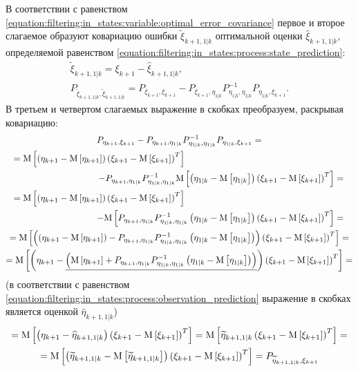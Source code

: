 В соответствии с равенством \eqref{equation:filtering:in_states:variable:optimal_error_covariance} первое и второе слагаемое образуют ковариацию ошибки
$\widetilde{\xi}_{k+1,1|k}$ оптимальной оценки $\widehat{\xi}_{k+1,1|k}$, определяемой равенством \eqref{equation:filtering:in_states:process:state_prediction}:
\begin{gather*}
	\widetilde{\xi}_{k+1,1|k} = \xi_{k+1} - \widehat{\xi}_{k+1,1|k} , \\
	P_{\widetilde{\xi}_{k+1,1|k}, \widetilde{\xi}_{k+1,1|k}} = P_{\xi_{k+1}, \xi_{k+1}} - P_{\xi_{k+1}, \eta_{1|k}} P_{\eta_{1|k},\eta_{1|k}}^{-1} P_{\eta_{1|k}, \xi_{k+1}}
	.
\end{gather*}
В третьем и четвертом слагаемых выражение в скобках преобразуем, раскрывая ковариацию:
\begin{multline*}
	P_{\eta_{k+1}, \xi_{k+1}} - P_{\eta_{k+1}, \eta_{1|k}} P_{\eta_{1|k},\eta_{1|k}}^{-1} P_{\eta_{1|k}, \xi_{k+1}} = \\
	\shoveleft{
		= \expectation{\centered{\eta_{k+1}} \centered{\xi_{k+1}}^T}
	} \\
	\shoveright{
		- P_{\eta_{k+1}, \eta_{1|k}} P_{\eta_{1|k},\eta_{1|k}}^{-1} \expectation{\centered{\eta_{1|k}} \centered{\xi_{k+1}}^T} =
	} \\
	\shoveleft{
		= \expectation{\centered{\eta_{k+1}} \centered{\xi_{k+1}}^T}
	} \\
	\shoveright{
		- \expectation{P_{\eta_{k+1}, \eta_{1|k}} P_{\eta_{1|k},\eta_{1|k}}^{-1} \centered{\eta_{1|k}} \centered{\xi_{k+1}}^T} =
	} \\
	= \expectation{\left ( \centered{\eta_{k+1}} - P_{\eta_{k+1}, \eta_{1|k}} P_{\eta_{1|k},\eta_{1|k}}^{-1} \centered{\eta_{1|k}} \right ) \centered{\xi_{k+1}}^T} = \\
	= \expectation{\left ( \eta_{k+1} - \underline{\left ( \expectation{\eta_{k+1}} + P_{\eta_{k+1}, \eta_{1|k}} P_{\eta_{1|k},\eta_{1|k}}^{-1} \centered{\eta_{1|k}} \right )} \right ) \centered{\xi_{k+1}}^T} = \\
\end{multline*}
(в соответствии с равенством \eqref{equation:filtering:in_states:process:observation_prediction} выражение в скобках является оценкой $\widehat{\eta}_{k+1,1|k}$)
\begin{multline*}
	= \mathrm{M} \left [ \left ( \eta_{k+1} - \widehat{\eta}_{k+1,1|k} \right ) \left ( \xi_{k+1} - \mathrm{M} \left [ \xi_{k+1} \right ] \right )^T \right ]
		= \mathrm{M} \left [ \widetilde{\eta}_{k+1,1|k} \left ( \xi_{k+1} - \mathrm{M} \left [ \xi_{k+1} \right ] \right )^T \right ] = \\
	= \mathrm{M} \left [ \left ( \widetilde{\eta}_{k+1,1|k} - \mathrm{M} \left [ \widetilde{\eta}_{k+1,1|k} \right ] \right ) \left ( \xi_{k+1} - \mathrm{M} \left [ \xi_{k+1} \right ] \right )^T \right ]
		= P_{\widetilde{\eta}_{k+1,1|k}, \xi_{k+1}}
\end{multline*}
